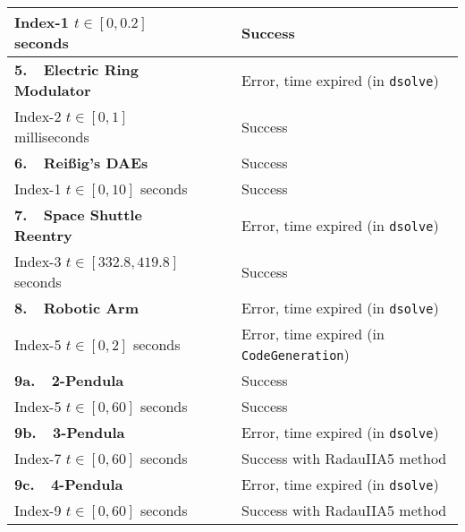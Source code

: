 {\begin{longtable}{lccl}
    Index-1 \quad $t \in [0, 0.2]$ seconds & \Indigo{} & \mycheckmark{}\phantom{\mywarnmark{}} & Success \\ \midrule
  \multirow{1}{*}{\textbf{5.~~Electric Ring Modulator~\cite{lioen1998test, mazzia2008test}}}
    & \Maple{}  & \mycrossmark{}\phantom{\mywarnmark{}} & Error, time expired (in \texttt{dsolve}) \\ \cmidrule(l{4pt}){2-4}
    Index-2 \quad $t \in [0, 1]$ milliseconds & \Indigo{} & \mycheckmark{}\phantom{\mywarnmark{}} & Success \\ \midrule
  \multirow{1}{*}{\textbf{6.~~Rei{\ss}ig's \acp{DAE}~\cite{reissig2000differential}}}
    & \Maple{}  & \mycheckmark{}\phantom{\mywarnmark{}} & Success \\ \cmidrule(l{4pt}){2-4}
    Index-1 \quad $t \in [0, 10]$ seconds & \Indigo{} & \mycheckmark{}\phantom{\mywarnmark{}} & Success \\ \midrule
  \multirow{1}{*}{\textbf{7.~~Space Shuttle Reentry~\cite{brenan1995numerical}}}
    & \Maple{}  & \mycrossmark{}\phantom{\mywarnmark{}} & Error, time expired (in \texttt{dsolve}) \\ \cmidrule(l{4pt}){2-4}
    Index-3 \quad $t \in [332.8, 419.8]$ seconds & \Indigo{} & \mycheckmark{}\phantom{\mywarnmark{}} & Success \\ \midrule
  \multirow{1}{*}{\textbf{8.~~Robotic Arm~\cite{pryce1998solving}}}
    & \Maple{}  & \mycrossmark{}\phantom{\mywarnmark{}} & Error, time expired (in \texttt{dsolve}) \\ \cmidrule(l{4pt}){2-4}
    Index-5 \quad $t \in [0, 2]$ seconds & \Indigo{} & \mycrossmark{}\phantom{\mywarnmark{}} & Error, time expired (in \texttt{CodeGeneration}) \\ \midrule
  \multirow{1}{*}{\textbf{9a.~~2-Pendula~\cite{pryce1998solving}}}
    & \Maple{}  & \mycheckmark{}\phantom{\mywarnmark{}} & Success \\ \cmidrule(l{4pt}){2-4}
    Index-5 \quad $t \in [0, 60]$ seconds & \Indigo{} & \mycheckmark{}\phantom{\mywarnmark{}} & Success \\ \midrule
  \multirow{1}{*}{\textbf{9b.~~3-Pendula~\cite{nedialkov2008solvingIII}}}
    & \Maple{}  & \mycrossmark{}\phantom{\mywarnmark{}} & Error, time expired (in \texttt{dsolve}) \\ \cmidrule(l{4pt}){2-4}
    Index-7 \quad $t \in [0, 60]$ seconds & \Indigo{} & \mycheckmark{}\mywarnmark{} & Success with RadauIIA5 method \\ \midrule
  \multirow{1}{*}{\textbf{9c.~~4-Pendula~\cite{nedialkov2008solvingIII}}}
    & \Maple{}  & \mycrossmark{}\phantom{\mywarnmark{}} & Error, time expired (in \texttt{dsolve}) \\ \cmidrule(l{4pt}){2-4}
    Index-9 \quad $t \in [0, 60]$ seconds & \Indigo{} & \mycheckmark{}\mywarnmark{} & Success with RadauIIA5 method \\
  \bottomrule
\end{longtable}}